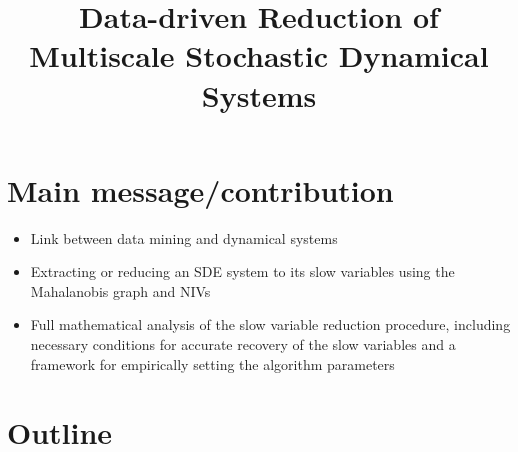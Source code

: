 \documentclass[12pt]{article}
\title{Data-driven Reduction of Multiscale Stochastic Dynamical Systems }
\begin{document}
\maketitle


\section{Main message/contribution}

\begin{itemize}

\item Link between data mining and dynamical systems

\item Extracting or reducing an SDE system to its slow variables using the Mahalanobis graph and NIVs

\item Full mathematical analysis of the slow variable reduction procedure, including necessary conditions for accurate recovery of the slow variables and a framework for empirically setting the algorithm parameters

\end{itemize}



\section{Outline}
\end{document}
